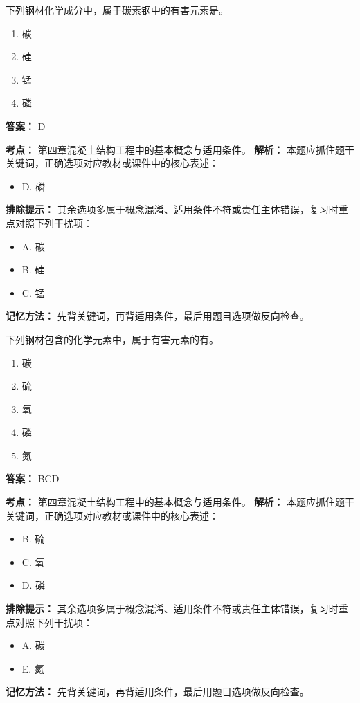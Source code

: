 \documentclass[UTF8,fontset=fandol,11pt]{ctexart}
\begin{document}
\begin{quizbox}[title={第 10 题}]
下列钢材化学成分中，属于碳素钢中的有害元素是。\\
\begin{enumerate}[label=\Alph*.]
\item 碳
\item 硅
\item 锰
\item 磷
\end{enumerate}
\textbf{答案：} D
\vspace{0.25em}
\begin{answerbox}[title={考点解析}]
\textbf{考点：} 第四章混凝土结构工程中的基本概念与适用条件。
\textbf{解析：} 本题应抓住题干关键词，正确选项对应教材或课件中的核心表述：
\begin{itemize}
\item D. 磷
\end{itemize}
\textbf{排除提示：} 其余选项多属于概念混淆、适用条件不符或责任主体错误，复习时重点对照下列干扰项：
\begin{itemize}
\item A. 碳
\item B. 硅
\item C. 锰
\end{itemize}
\textbf{记忆方法：} 先背关键词，再背适用条件，最后用题目选项做反向检查。
\end{answerbox}
\end{quizbox}

\begin{quizbox}[title={第 11 题}]
下列钢材包含的化学元素中，属于有害元素的有。\\
\begin{enumerate}[label=\Alph*.]
\item 碳
\item 硫
\item 氧
\item 磷
\item 氮
\end{enumerate}
\textbf{答案：} BCD
\vspace{0.25em}
\begin{answerbox}[title={考点解析}]
\textbf{考点：} 第四章混凝土结构工程中的基本概念与适用条件。
\textbf{解析：} 本题应抓住题干关键词，正确选项对应教材或课件中的核心表述：
\begin{itemize}
\item B. 硫
\item C. 氧
\item D. 磷
\end{itemize}
\textbf{排除提示：} 其余选项多属于概念混淆、适用条件不符或责任主体错误，复习时重点对照下列干扰项：
\begin{itemize}
\item A. 碳
\item E. 氮
\end{itemize}
\textbf{记忆方法：} 先背关键词，再背适用条件，最后用题目选项做反向检查。
\end{answerbox}
\end{quizbox}
\end{document}
